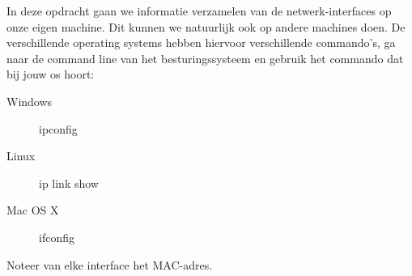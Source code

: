 In deze opdracht gaan we informatie verzamelen van de netwerk-interfaces op onze eigen machine. Dit kunnen we natuurlijk ook op andere machines doen. De verschillende operating systems hebben hiervoor verschillende commando's, ga naar de command line van het besturingssysteem en gebruik het commando dat bij jouw os hoort:
\begin{description}
\item[Windows] ipconfig
\item[Linux] ip link show
\item[Mac OS X] ifconfig
\end{description}

Noteer van elke interface het MAC-adres.
